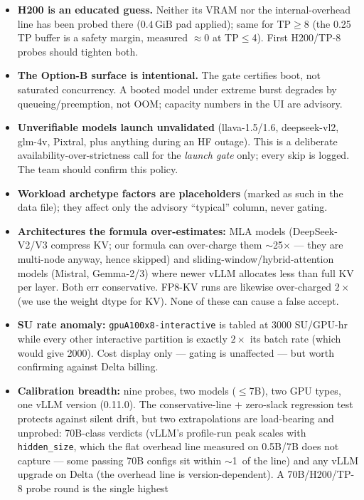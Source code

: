 \documentclass[11pt]{article}
\newcommand{\code}[1]{\texttt{#1}}
\newcommand{\gib}{\,\text{GiB}}
\begin{document}
\begin{itemize}[leftmargin=1.4em]
\item \textbf{H200 is an educated guess.} Neither its VRAM nor the
  internal-overhead line has been probed there ($0.4\gib$ pad applied);
  same for TP$\ge$8 (the 0.25\gib{} TP buffer is a safety margin, measured
  $\approx$0 at TP$\le$4). First H200/TP-8 probes should tighten both.
\item \textbf{The Option-B surface is intentional.} The gate certifies boot,
  not saturated concurrency. A booted model under extreme burst degrades by
  queueing/preemption, not OOM; capacity numbers in the UI are advisory.
\item \textbf{Unverifiable models launch unvalidated} (llava-1.5/1.6,
  deepseek-vl2, glm-4v, Pixtral, plus anything during an HF outage). This is
  a deliberate availability-over-strictness call for the \emph{launch gate}
  only; every skip is logged. The team should confirm this policy.
\item \textbf{Workload archetype factors are placeholders} (marked as such in
  the data file); they affect only the advisory ``typical'' column, never
  gating.
\item \textbf{Architectures the formula over-estimates:} MLA models
  (DeepSeek-V2/V3 compress KV; our formula can over-charge them
  $\sim$25$\times$ --- they are multi-node anyway, hence skipped) and
  sliding-window/hybrid-attention models (Mistral, Gemma-2/3) where newer
  vLLM allocates less than full KV per layer. Both err conservative.
  FP8-KV runs are likewise over-charged $2\times$ (we use the weight dtype
  for KV). None of these can cause a false accept.
\item \textbf{SU rate anomaly:} \code{gpuA100x8-interactive} is tabled at
  3000 SU/GPU-hr while every other interactive partition is exactly $2\times$
  its batch rate (which would give 2000). Cost display only --- gating is
  unaffected --- but worth confirming against Delta billing.
\item \textbf{Calibration breadth:} nine probes, two models ($\le$7B), two
  GPU types, one vLLM version (0.11.0). The conservative-line + zero-slack
  regression test protects against silent drift, but two extrapolations are
  load-bearing and unprobed: 70B-class verdicts (vLLM's profile-run peak
  scales with \code{hidden\_size}, which the flat overhead line measured on
  0.5B/7B does not capture --- some passing 70B configs sit within
  $\sim$1\gib{} of the line) and any vLLM upgrade on Delta (the overhead line
  is version-dependent). A 70B/H200/TP-8 probe round is the single highest

\end{itemize}
\end{document}
